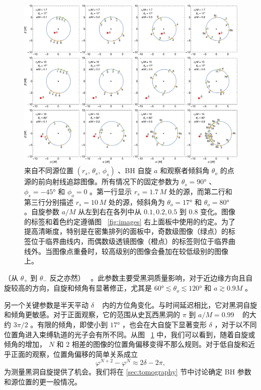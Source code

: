 \documentclass[aps,reprint,superscriptaddress,nofootinbib,floatfix,longbibliography,preprintnumbers]{revtex4-1}
\begin{document}
   \begin{figure}
    \centering
    \includegraphics[width=\textwidth]{figures/images_ia_a.pdf}
    \caption{来自不同源位置    $(r_s,\,\theta_s,\,\phi_s)$    、BH 自旋    $a$    和观察者倾斜角    $\theta_o$    的点源的前向射线追踪图像。所有情况下的固定参数为    $\theta_s = \ang{90}$    、    $\phi_s = -\ang{45}$    和    $\phi_o = 0$    。第一行显示    $r_s = 1.7\,M$    处的源，而第二行和第三行分别描述    $r_s = 10\,M$    处的源，倾斜角为    $\theta_o = \ang{17}$    和    $\theta_o = \ang{80}$    。自旋参数    $a/M$    从左到右在各列中从    $0.1, 0.2, 0.5$    到    $0.8$    变化。图像的标签和着色约定遵循图~    \ref{fig:images}    右上面板中使用的约定。为了提高清晰度，特别是在密集排列的面板中，奇数级图像（绿点）的标签位于临界曲线内，而偶数级透镜图像（橙点）的标签则位于临界曲线外。当图像点重叠时，较高级别的图像会叠加在较低级别的图像上。  }
    \label{fig:images for various spins}
\end{figure}     

   \clearpage     

   \noindent   （从    $\theta_+$    到    $\theta_-$    反之亦然）~    \cite{Gralla:2019drh}    。此参数主要受黑洞质量影响，对于近边缘方向且自旋较高的方向，自旋和倾角有显著修正，尤其是    $\ang{60}\lesssim\theta_o\lesssim\ang{120}$    和    $a\gtrsim 0.9M$    。  

另一个关键参数是半天平动    $\delta$    ~    \cite{Gralla:2019drh}    内的方位角变化。与时间延迟相比，它对黑洞自旋和倾角更敏感。对于正面观察，它的范围从史瓦西黑洞的    $\pi$    到    $a/M = 0.99$    ~    \cite{Gralla:2019drh}    的大约    $3\pi/2$   。有限的倾角，即使小到    $\ang{17}$    ，也会在大自旋下显著变形    $\delta$    ，对于以不同位置角进入束缚轨道的光子会有所不同。从图~    \ref{fig:images for various spins}    中，我们可以看到，随着自旋或倾角的增加，   $N$    和    $2$    相差的图像的位置角偏移变得不那么规则。对于低自旋和近乎正面的观察，位置角偏移的简单关系成立
   \begin{equation}
\varphi^{N+2} - \varphi^N \approx 2\delta - 2\pi,
\end{equation}    为测量黑洞自旋提供了机会。我们将在    \ref{sec:tomography}    节中讨论确定 BH 参数和源位置的更一般情况。
\end{document}
